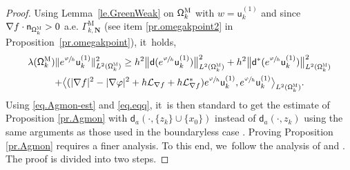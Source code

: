 \documentclass[10pt]{amsart}
\newcommand{\mbf}[1]{\mathbf{#1}}
\theoremstyle{plain}
\theoremstyle{definition}
\begin{document}
\begin{proof}
Using Lemma~\ref{le.GreenWeak} on $\mathsf \Omega_k^{\textsc{M}}$ with $w=\mathsf u^{(1)}_k$ and since $\nabla f \cdot \mathsf n_{\mathsf \Omega_k^{\textsc{M}} }> 0$ a.e. $\Gamma_{k, \mbf N}^{\text{M}}$ (see item \eqref{pr.omegakpoint2} in Proposition~\ref{pr.omegakpoint}), it~holds,
\begin{multline} \label{eq.Agmon-est}
\lambda(\mathsf \Omega_k^{\textsc{M}}) \Vert e^{\sfrac{\varphi}{h}} \mathsf u^{(1)}_k \Vert_{ L^{2} (\mathsf \Omega_k^{\textsc{M}})}^2\ge
h^{2}\big \| \mathsf d (e^{\sfrac{\varphi}{h}} \mathsf u^{(1)}_k)\big \|^{2}_{ L^{2} (\mathsf \Omega_k^{\textsc{M}})}+
h^{2} \big \| \mathsf d^{*} (e^{\sfrac{\varphi}{h}} \mathsf u^{(1)}_k) \big \|^{2}_{ L^{2} (\mathsf \Omega_k^{\textsc{M}})}\\
+ \big \langle
(|\nabla f|^{2}-|\nabla \varphi|^{2}+h\mathcal{L}_{\nabla
f}+h\mathcal{L}_{\nabla
f}^{*})e^{\sfrac{\varphi}{h}} \mathsf u^{(1)}_k, e^{\sfrac{\varphi}{h}}
\mathsf u^{(1)}_k\big \rangle_{ L^{2} (\mathsf \Omega_k^{\textsc{M}})}.
\end{multline}
Using \eqref{eq.Agmon-est} and \eqref{eq.eqq}, it~is then standard to get the estimate of Proposition \ref{pr.Agmon} with $\mathsf d_a(\cdot,\{z_k\}\cup \{x_0\})$ instead of $\mathsf d_a(\cdot,z_k)$ using the same arguments as those used in the boundaryless case \cite[Prop.\,3.3.1]{helffer-88}. Proving Proposition \ref{pr.Agmon} requires a finer analysis. To this end, we~follow the analysis of \cite[\S2.2]{HelSjII} and \cite[\S6.c]{DiSj}.
The proof is divided into two steps.


\end{proof}
\end{document}
